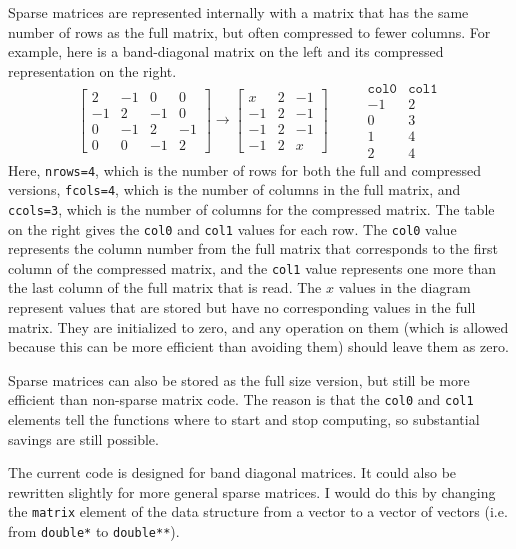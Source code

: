 \documentclass[11pt]{article}
\newcommand {\ttt} {\texttt}
\begin{document}
Sparse matrices are represented internally with a matrix that has the same number of rows as the full matrix, but often compressed to fewer columns. For example, here is a band-diagonal matrix on the left and its compressed representation on the right.
$$\left[ \begin{array}{cccc}
2 & -1 & 0 & 0\\
-1 & 2 & -1 & 0\\
0 & -1 & 2 & -1 \\
0 & 0 & -1 & 2
\end{array} \right] \rightarrow
\left[ \begin{array}{ccc}
x & 2 & -1\\
-1 & 2 & -1\\
-1 & 2 & -1 \\
-1 & 2 & x
\end{array} \right] \hspace{1cm}
\begin{array}{cc}
\ttt{col0} & \ttt{col1} \\ \hline
-1 & 2\\
0 & 3\\
1 & 4 \\
2 & 4
\end{array}
$$
Here, \ttt{nrows=4}, which is the number of rows for both the full and compressed versions, \ttt{fcols=4}, which is the number of columns in the full matrix, and \ttt{ccols=3}, which is the number of columns for the compressed matrix. The table on the right gives the \ttt{col0} and \ttt{col1} values for each row. The \ttt{col0} value represents the column number from the full matrix that corresponds to the first column of the compressed matrix, and the \ttt{col1} value represents one more than the last column of the full matrix that is read. The $x$ values in the diagram represent values that are stored but have no corresponding values in the full matrix. They are initialized to zero, and any operation on them (which is allowed because this can be more efficient than avoiding them) should leave them as zero.

Sparse matrices can also be stored as the full size version, but still be more efficient than non-sparse matrix code. The reason is that the \ttt{col0} and \ttt{col1} elements tell the functions where to start and stop computing, so substantial savings are still possible.

The current code is designed for band diagonal matrices. It could also be rewritten slightly for more general sparse matrices. I would do this by changing the \ttt{matrix} element of the data structure from a vector to a vector of vectors (i.e. from \ttt{double*} to \ttt{double**}).
\end{document}
